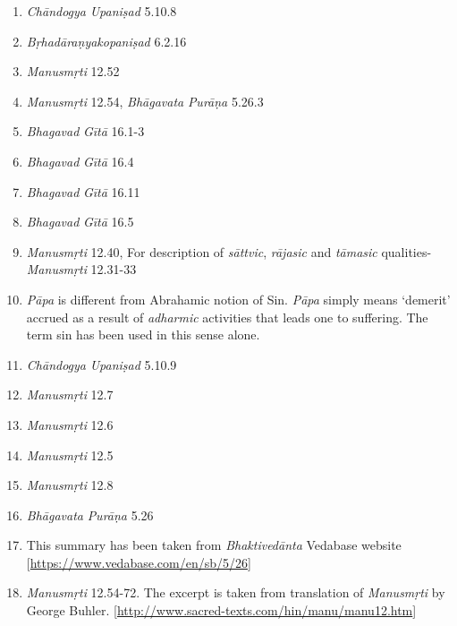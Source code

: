 \begin{enumerate}
\itemsep=0pt
\item
\emph{Chāndogya} \emph{Upaniṣad} 5.10.8
\item
\emph{Bṛhadāraṇyakopaniṣad} 6.2.16
\item
\emph{Manusmṛti} 12.52
\item
\emph{Manusmṛti} 12.54, \emph{Bhāgavata} \emph{Purāṇa} 5.26.3
\item
\emph{Bhagavad} \emph{Gītā} 16.1-3
\item
\emph{Bhagavad} \emph{Gītā} 16.4
\item
\emph{Bhagavad} \emph{Gītā} 16.11
\item
\emph{Bhagavad} \emph{Gītā} 16.5
\item
\emph{Manusmṛti} 12.40, For description of \emph{sāttvic}, \emph{rājasic} and \emph{tāmasic} qualities- \emph{Manusmṛti} 12.31-33
\item
\emph{Pāpa} is different from Abrahamic notion of Sin. \emph{Pāpa} simply means `demerit' accrued as a result of \emph{adharmic} activities that leads one to suffering. The term sin has been used in this sense alone.
\item
\emph{Chāndogya} \emph{Upaniṣad} 5.10.9
\item
\emph{Manusmṛti} 12.7
\item
\emph{Manusmṛti} 12.6
\item
\emph{Manusmṛti} 12.5
\item
\emph{Manusmṛti} 12.8
\item
\emph{Bhāgavata} \emph{Purāṇa} 5.26
\item
This summary has been taken from \emph{Bhaktivedānta} Vedabase website {[}\url{https://www.vedabase.com/en/sb/5/26}{]}
\item
\emph{Manusmṛti} 12.54-72. The excerpt is taken from translation of \emph{Manusmṛti} by George Buhler. {[}\url{http://www.sacred-texts.com/hin/manu/manu12.htm}{]}
\end{enumerate}

